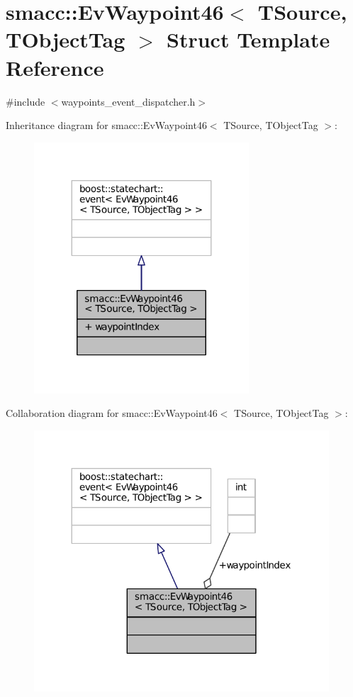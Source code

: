 \hypertarget{structsmacc_1_1EvWaypoint46}{}\section{smacc\+:\+:Ev\+Waypoint46$<$ T\+Source, T\+Object\+Tag $>$ Struct Template Reference}
\label{structsmacc_1_1EvWaypoint46}


{\ttfamily \#include $<$waypoints\+\_\+event\+\_\+dispatcher.\+h$>$}



Inheritance diagram for smacc\+:\+:Ev\+Waypoint46$<$ T\+Source, T\+Object\+Tag $>$\+:
\nopagebreak
\begin{figure}[H]
\begin{center}
\leavevmode
\includegraphics[width=227pt]{structsmacc_1_1EvWaypoint46__inherit__graph}
\end{center}
\end{figure}


Collaboration diagram for smacc\+:\+:Ev\+Waypoint46$<$ T\+Source, T\+Object\+Tag $>$\+:
\nopagebreak
\begin{figure}[H]
\begin{center}
\leavevmode
\includegraphics[width=312pt]{structsmacc_1_1EvWaypoint46__coll__graph}
\end{center}
\end{figure}

